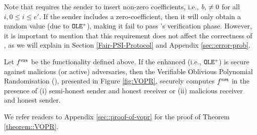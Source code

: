 \vspace{-4.5mm}


Note that \vopr requires the sender to insert non-zero coefficients, i.e., $b_{\scriptscriptstyle i}\neq 0$ for all $i,0 \leq i \leq e'$. If the sender includes a zero-coefficient, then it will only obtain a random value (due to  $\mathtt{OLE}^{\scriptscriptstyle +}$), making it fail to pass \vopr's verification phase. However, it is important to mention that this requirement does not affect the correctness of \withFai, as we will explain in Section \ref{Fair-PSI-Protocol} and Appendix \ref{sec::error-prob}.  

\vspace{-2mm}



\begin{theorem}\label{theorem::VOPR}
%
Let $f^{\scriptscriptstyle \mathtt{VOPR}}$ be the functionality defined above. If the enhanced \ole (i.e., $\mathtt{OLE}^{\scriptscriptstyle +}$) is secure against malicious (or active) adversaries, then the  Verifiable Oblivious Polynomial Randomisation (\vopr), presented in Figure \ref{fig:VOPR}, securely computes $f^{\scriptscriptstyle \mathtt{VOPR}}$ in the presence of (i) semi-honest sender and honest receiver or (ii) malicious receiver and honest sender. 
%
\end{theorem}

\vspace{-1mm}
We refer readers to Appendix \ref{sec::proof-of-vopr} for the proof of Theorem \ref{theorem::VOPR}. 




%

